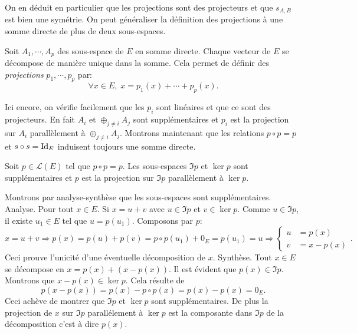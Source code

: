 On en déduit en particulier que les projections sont des projecteurs et que $s_{A,B}$ est bien une symétrie.\newline
On peut généraliser la définition des projections à une somme directe de plus de deux sous-espaces.
\begin{defi}
 Soit $A_1, \cdots, A_p$ des sous-espace de $E$ en somme directe. Chaque vecteur de $E$ se décompose de manière unique dans la somme. Cela permet de définir des \emph{projections} $p_1, \cdots, p_p$ par:
 \[
  \forall x \in E, \; x = p_1(x) + \cdots + p_p(x).
 \]
\end{defi}
Ici encore, on vérifie facilement que les $p_i$ sont linéaires et que ce sont des projecteurs. En fait $A_i$ et $\oplus_{j\neq i}A_j$ sont supplémentaires et $p_i$ est la projection sur $A_i$ parallèlement à $\oplus_{j\neq i}A_j$.\newline
Montrons maintenant que les relations $p\circ p = p$ et $s\circ s = \mathop{\mathrm{Id}}_E$ induisent toujours une somme directe.
\begin{prop}
 Soit $p\in \mathcal L(E)$ tel que $p\circ p = p$. Les sous-espaces $\Im p$ et $\ker p$ sont supplémentaires et $p$ est la projection sur $\Im p$ parallèlement à $\ker p$.
\end{prop}
\begin{demo}
 Montrons par analyse-synthèse que les sous-espaces sont supplémentaires.\newline
 Analyse. Pour tout $x\in E$. Si $x = u +v$ avec $u\in \Im p$ et $v \in \ker p$. Comme $u \in \Im p$, il existe $u_1\in E$ tel que $u = p(u_1)$. Composons par $p$:
\[
  x = u + v \Rightarrow p(x) = p(u) + p(v) = p\circ p (u_1) + 0_E = p(u_1) = u
  \Rightarrow 
  \left\lbrace
  \begin{aligned}
    u &= p(x) \\ v &= x - p(x)
  \end{aligned}
  \right. .
\]
Ceci prouve l'unicité d'une éventuelle décomposition de $x$.\newline
Synthèse. Tout $x\in E$ se décompose en $x = p(x) + (x - p(x))$. Il est évident que $p(x)\in \Im p$. Montrons que $x - p(x) \in \ker p$. Cela résulte de 
\[
  p(x-p(x)) = p(x) - p\circ p(x) = p(x) -p(x) = 0_E.
\]
Ceci achève de montrer que $\Im p$ et $\ker p$ sont supplémentaires. De plus la projection de $x$ sur $\Im p$ parallélement à $\ker p$ est la composante dans $\Im p$ de la décomposition c'est à dire $p(x)$.
\end{demo}

